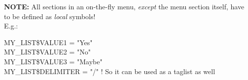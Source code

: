 \documentclass[a4paper]{book}
\newcommand{\vs}{\vspace{3mm}}
\renewcommand{\indent}{\hspace*{5mm}}
\begin{document}
\vs

\hspace{-8mm}\textbf{NOTE:} All sections in an on-the-fly menu, \textit{except} the menu section itself, 
have to be defined as \textit{local} symbols! \\
E.g.: \\
\begin{textsf}
\indent{\$} MY{\_}LIST{\$}VALUE1 = "Yes" \\
\indent{\$} MY{\_}LIST{\$}VALUE2 = "No" \\
\indent{\$} MY{\_}LIST{\$}VALUE3 = "Maybe" \\
\indent{\$} MY{\_}LIST{\$}DELIMITER = "/" ! So it can be used as a taglist as well \\
\end{textsf}

\vs
\end{document}
